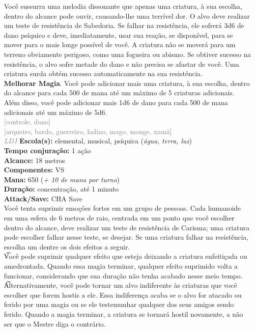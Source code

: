 \documentclass{RPG_Adventure}[2021/10/20]
\begin{document}
{\normalsize Você sussurra uma melodia dissonante que apenas uma criatura, à sua escolha, dentro do alcance pode ouvir, causando-lhe uma terrível dor. O alvo deve realizar um teste de resistência de Sabedoria. Se falhar na resistência, ele sofrerá 3d6 de dano psíquico e deve, imediatamente, usar sua reação, se disponível, para se mover para o mais longe possível de você. A criatura não se moverá para um terreno obviamente perigoso, como uma fogueira ou abismo. Se obtiver sucesso na resistência, o alvo sofre metade do dano e não precisa se afastar de você. Uma criatura surda obtém sucesso automaticamente na sua resistência.\\\t \textbf{Melhorar Magia}. Você pode adicionar mais uma criatura, à sua escolha, dentro do alcance para cada 500 de mana até um máximo de 5 criaturas adicionais. Além disso, você pode adicionar mais 1d6 de dano para cada 500 de mana adicionais até um máximo de 5d6.\\}
{\scriptsize \textcolor{gray}{[controle, dano]\\}}
{\scriptsize \textcolor{gray}{[arqueiro, bardo, guerreiro, ladino, mago, monge, xamã]\\}}
{\tiny \textcolor{gray}{\textit{LDJ}}}\jump{}
{\small \t \textbf{Escola(s):} elemental, musical, psíquica (\textit{água, terra, luz})\\\t \textbf{Tempo conjuração:} 1 ação\\\t \textbf{Alcance:} 18 metros\\\t \textbf{Componentes:} VS\\\t \textbf{Mana:} 650 (\textit{+ 10 de mana por turno})\\\t \textbf{Duração:} concentração, até 1 minuto\\\t \textbf{Attack/Save:} CHA Save\\}
{\normalsize Você tenta suprimir emoções fortes em um grupo de pessoas. Cada humanoide em uma esfera de 6 metros de raio, centrada em um ponto que você escolher dentro do alcance, deve realizar um teste de resistência de Carisma; uma criatura pode escolher falhar nesse teste, se desejar.  Se uma criatura falhar na resistência, escolha um dentre os dois efeitos a seguir.\\\t Você pode suprimir qualquer efeito que esteja deixando a criatura enfeitiçada ou amedrontada. Quando essa magia terminar, qualquer efeito suprimido volta a funcionar, considerando que sua duração não tenha acabado nesse meio tempo.\\\t Alternativamente, você pode tornar um alvo indiferente às criaturas que você escolher que forem hostis a ele. Essa indiferença acaba se o alvo for atacado ou ferido por uma magia ou se ele testemunhar qualquer dos seus amigos sendo ferido. Quando a magia terminar, a criatura se tornará hostil novamente, a não ser que o Mestre diga o contrário.\\}
\end{document}
